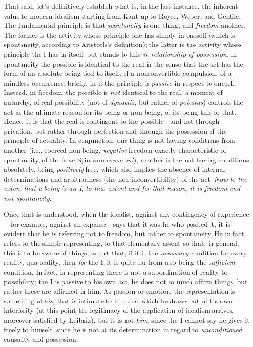 That said, let's definitively establish what is, in the last instance, the inherent value to modern idealism starting from Kant up to Royce, Weber, and Gentile. The fundamental principle is that \emph{spontaneity} is one thing, and \emph{freedom} another. The former is the activity whose principle one has simply in oneself (which is spontaneity, according to Aristotle's definition); the latter is the activity whose principle the I has in itself, but stands to this \emph{in relationship of possession}. In spontaneity the possible is identical to the real in the sense that the act has the form of an absolute being-tied-to-itself, of a nonconvertible compulsion, of a mindless occurrence: briefly, in it the principle is \emph{passive} in respect to oneself. Instead, in freedom, the possible is \emph{not} identical to the real, a moment of autarchy, of real possibility (not of \emph{dynamis}, but rather of \emph{potestas}) controls the act as the ultimate reason for its being or non-being, of its being this or that. Hence, it is that the real is contingent to the possible—and not through privation, but rather through perfection and through the possession of the principle of actuality. In conjunction: one thing is not having conditions from another (i.e., coerced non-being, \emph{negative} freedom exactly characteristic of spontaneity, of the false Spinozan \emph{causa sui}), another is the not having conditions absolutely, being \emph{positively} free, which also implies the absence of internal determinations and arbitrariness (the non-inconvertibility) of the act. \emph{Now to the extent that a being is an I, to that extent and for that reason, it is freedom and not spontaneity}.

Once that is understood, when the idealist, against any contingency of experience—for example, against an expanse—says that it was he who posited it, it is evident that he is referring not to freedom, but rather to spontaneity. He in fact refers to the simple representing, to that elementary assent so that, in general, this is to be aware of things, assent that, if it is the \emph{necessary} condition for every reality, qua reality, then \emph{for} the I, it is quite far from also being the \emph{sufficient} condition. In fact, in representing there is not a subordination of reality to possibility; the I is passive to his own act, he does not so much affirm things, but rather these are affirmed in him. As passion or emotion, the representation is something of \emph{his}, that is intimate to him and which he draws out of his own interiority (at this point the legitimacy of the application of idealism arrives, moreover satisfied by Leibniz), but it is not \emph{him}, since the I cannot say he gives it freely to himself, since he is not at its determination in regard to \emph{unconditioned} causality and possession.


